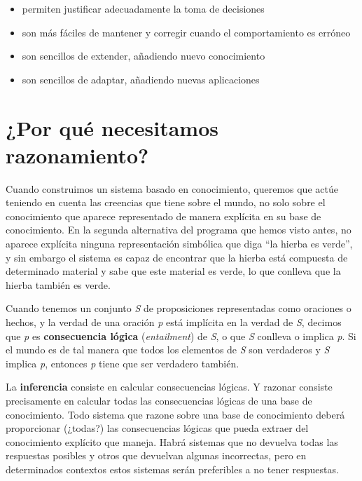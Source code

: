 \documentclass{tufte-handout}
\begin{document}
\begin{itemize}
\item
  permiten
  justificar adecuadamente la toma de decisiones
\item
  son más fáciles de mantener
  y corregir cuando el comportamiento es erróneo
\item
  son sencillos de extender, añadiendo
  nuevo conocimiento
\item
  son
  sencillos de adaptar, añadiendo nuevas aplicaciones
\end{itemize}

\section{¿Por qué necesitamos
razonamiento?}\label{por-que-necesitamos-razonamiento}

Cuando construimos un sistema basado en conocimiento, queremos que actúe
teniendo en cuenta las creencias que tiene sobre el mundo, no solo sobre
el conocimiento que aparece representado de manera explícita en su base
de conocimiento. En la segunda alternativa del programa que hemos visto
antes, no aparece explícita ninguna representación simbólica que diga
``la hierba es verde'', y sin embargo el sistema es capaz de encontrar
que la hierba está compuesta de determinado material y sabe que este
material es verde, lo que conlleva que la hierba también es verde.

Cuando tenemos un conjunto \emph{S} de proposiciones representadas como
oraciones o hechos, y la verdad de una oración \emph{p} está implícita
en la verdad de \emph{S}, decimos que \emph{p} es \textbf{consecuencia
lógica} (\emph{entailment}) de \emph{S}, o que \emph{S} conlleva o
implica \emph{p}. Si el mundo es de tal manera que todos los elementos
de \emph{S} son verdaderos y \emph{S} implica \emph{p}, entonces
\emph{p} tiene que ser verdadero también.

La \textbf{inferencia} consiste en calcular consecuencias lógicas. Y
razonar consiste precisamente en calcular todas las consecuencias
lógicas de una base de conocimiento. Todo sistema que razone sobre una
base de conocimiento deberá proporcionar (¿todas?) las consecuencias
lógicas que pueda extraer del conocimiento explícito que maneja. Habrá
sistemas que no devuelva todas las respuestas posibles y otros que
devuelvan algunas incorrectas, pero en determinados contextos estos
sistemas serán preferibles a no tener respuestas.
\end{document}

